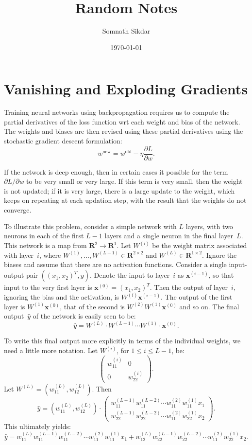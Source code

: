 \documentclass[12pt]{article}
\title{Random Notes}
\author{Somnath Sikdar}
\date{\today}
\theoremstyle{definition}
\newcommand{\R}{\ensuremath{\bm{R}}}
\newcommand{\vect}[1]{\ensuremath{\boldsymbol{#1}}}
\begin{document}
\section{Vanishing and Exploding Gradients}
Training neural networks using backpropagation requires us to compute the 
partial derivatives of the loss function wrt each weight and bias of the network.
The weights and biases are then revised using these partial derivatives using the 
stochastic gradient descent formulation:
\[
    w^{\text{new}} = w^{\text{old}} - \eta \frac{\partial L}{\partial w}.
\]

If the network is deep enough, then in certain cases it possible for 
the term $\partial L / \partial w$ to be very small or very large. If this term 
is very small, then the weight is not updated; if it is very large, there is a 
large update to the weight, which keeps on repeating at each updation step, with 
the result that the weights do not converge. 

To illustrate this problem, consider a simple network with $L$ layers, with 
two neurons in each of the first $L - 1$ layers and a single neuron in the 
final layer~$L$. This network is a map from $\R^2 \to \R^1$. Let 
$W^{(i)}$ be the weight matrix associated with layer~$i$, where 
$W^{(1)}, \ldots, W^{(L - 1)} \in \R^{2 \times 2}$ and $W^{(L)} \in \R^{1 \times 2}$. 
Ignore the biases and assume that there are no activation functions. Consider 
a single input-output pair $((x_1, x_2)^{T}, y)$. 
Denote the input to layer~$i$ as $\vect{x}^{(i - 1)}$, so that input to the 
very first layer is $\vect{x}^{(0)} = (x_1, x_2)^{T}$. Then the output of 
layer~$i$, ignoring the bias and the activation, is $W^{(i)} \vect{x}^{(i - 1)}$. 
The output of the first layer is $W^{(1)} \vect{x}^{(0)}$, that of the second 
is $W^{(2)} W^{(1)} \vect{x}^{(0)}$ and so on. The final output~$\hat{y}$ of the 
network is easily seen to be:
\[
    \hat{y} = W^{(L)} \cdot W^{(L - 1)} \cdots W^{(1)} \cdot \vect{x}^{(0)}.
\]

To write this final output more explicitly in terms of the individual weights, 
we need a little more notation. Let $W^{(i)}$, for $1 \leq i \leq L - 1$, be:
\[
    \left ( 
        \begin{array}{cc}
            w_{11}^{(i)} & 0            \\
            0            & w_{22}^{(i)}
        \end{array}
    \right ).
\]
Let $W^{(L)} = (w_{11}^{(L)}, w_{12}^{(L)})$. Then 
\[
    \hat{y} = (w_{11}^{(L)}, w_{12}^{(L)}) \cdot 
             \left ( 
                \begin{array}{cc}
                    w_{11}^{(L - 1)} w_{11}^{(L - 2)} \cdots w_{11}^{(2)} w_{11}^{(1)} x_1 \\
                    w_{22}^{(L - 1)} w_{22}^{(L - 2)} \cdots w_{11}^{(2)} w_{22}^{(1)} x_2
                \end{array}
            \right ).
\]
This ultimately yields:
\[
    \hat{y} =  w_{11}^{(L)} w_{11}^{(L - 1)} w_{11}^{(L - 2)} \cdots w_{11}^{(2)} w_{11}^{(1)} x_1 
               + w_{12}^{(L)} w_{22}^{(L - 1)} w_{22}^{(L - 2)} \cdots w_{11}^{(2)} w_{22}^{(1)} x_2.
\]
\end{document}

